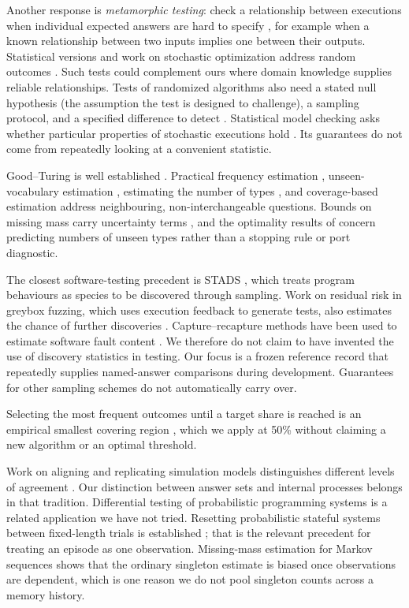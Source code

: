 \documentclass[10pt,letterpaper]{article}
\begin{document}
Another response is \emph{metamorphic testing}: check a relationship between executions
when individual expected answers are hard to specify \citep{ref7, ref5, ref28}, for
example when a known relationship between two inputs implies one between their outputs.
Statistical versions and work on stochastic optimization address random outcomes
\citep{ref6, ref27}. Such tests could complement ours where domain knowledge supplies
reliable relationships. Tests of randomized algorithms also need a stated null hypothesis
(the assumption the test is designed to challenge), a sampling protocol, and a specified
difference to detect \citep{ref31}. Statistical model checking asks whether particular
properties of stochastic executions hold \citep{ref15, ref16}. Its guarantees do not come
from repeatedly looking at a convenient statistic.

Good--Turing is well established \citep{ref8}. Practical frequency estimation
\citep{ref9}, unseen-vocabulary estimation \citep{ref11}, estimating the number of types
\citep{ref12}, and coverage-based estimation \citep{ref30} address neighbouring,
non-interchangeable questions. Bounds on missing mass carry uncertainty terms
\citep{ref10}, and the optimality results of \citet{ref29} concern predicting numbers of
unseen types rather than a stopping rule or port diagnostic.

The closest software-testing precedent is STADS \citep{ref13}, which treats program
behaviours as species to be discovered through sampling. Work on residual risk in greybox
fuzzing, which uses execution feedback to generate tests, also estimates the chance of
further discoveries \citep{ref14}. Capture--recapture methods have been used to estimate
software fault content \citep{ref25}. We therefore do not claim to have invented the use
of discovery statistics in testing. Our focus is a frozen reference record that repeatedly
supplies named-answer comparisons during development. Guarantees for other sampling
schemes do not automatically carry over.

Selecting the most frequent outcomes until a target share is reached is an empirical
smallest covering region \citep{ref33}, which we apply at 50\% without claiming a new
algorithm or an optimal threshold.

Work on aligning and replicating simulation models distinguishes different levels of
agreement \citep{ref19, ref20}. Our distinction between answer sets and internal processes
belongs in that tradition. Differential testing of probabilistic programming systems
\citep{ref18} is a related application we have not tried. Resetting probabilistic stateful
systems between fixed-length trials is established \citep{ref34}; that is the relevant
precedent for treating an episode as one observation. Missing-mass estimation for Markov
sequences \citep{ref35} shows that the ordinary singleton estimate is biased once
observations are dependent, which is one reason we do not pool singleton counts across a
memory history.
\end{document}
